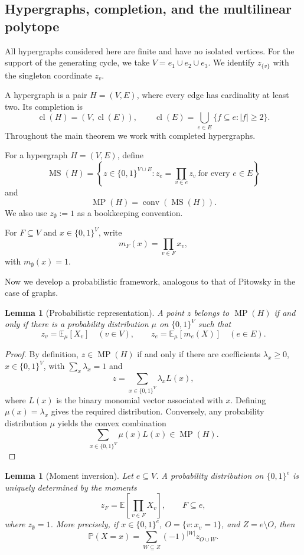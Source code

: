 \documentclass[11pt]{article}
\newtheorem{lemma}[theorem]{Lemma}
\theoremstyle{definition}
\theoremstyle{remark}
\newcommand{\cl}{\operatorname{cl}}
\newcommand{\MP}{\operatorname{MP}}
\newcommand{\E}{\mathbb{E}}
\newcommand{\Prob}{\mathbb{P}}
\newcommand{\MS}{\operatorname{MS}}
\begin{document}
\begin{editedaiblock}

\subsection{Hypergraphs, completion, and the multilinear polytope}

All hypergraphs considered here are finite and have no isolated vertices. For the support of the generating cycle, we take $V=e_1\cup e_2\cup e_3$. We identify $z_{\{v\}}$ with the singleton coordinate $z_v$.

A hypergraph is a pair $H=(V,E)$, where every edge has cardinality at least two. Its completion is
\[
\cl(H)=(V,\cl(E)),\qquad
\cl(E)=\bigcup_{e\in E}\{f\subseteq e:|f|\ge 2\}.
\]
Throughout the main theorem we work with completed hypergraphs.

For a hypergraph $H=(V,E)$, define
\[
\MS(H)=\left\{z\in\{0,1\}^{V\cup E}:z_e=\prod_{v\in e}z_v\ \text{for every }e\in E\right\}
\]
and
\[
\MP(H)=\operatorname{conv}(\MS(H)).
\]
We also use $z_\emptyset:=1$ as a bookkeeping convention.

For $F\subseteq V$ and $x\in\{0,1\}^V$, write
\[
m_F(x)=\prod_{v\in F}x_v,
\]
with $m_\emptyset(x)=1$.

Now we develop a probabilistic framework, analogous to that of Pitowsky \cite{pitowsky1991correlation} in the case of graphs.

\begin{lemma}[Probabilistic representation]\label{lem:prob}
A point $z$ belongs to $\MP(H)$ if and only if there is a probability distribution $\mu$ on $\{0,1\}^V$ such that
\[
z_v=\E_\mu[X_v]\quad(v\in V),\qquad
z_e=\E_\mu[m_e(X)]\quad(e\in E).
\]
\end{lemma}

\begin{proof}
By definition, $z\in\MP(H)$ if and only if there are coefficients $\lambda_x\ge 0$, $x\in\{0,1\}^V$, with $\sum_x\lambda_x=1$ and
\[
z=\sum_{x\in\{0,1\}^V}\lambda_x L(x),
\]
where $L(x)$ is the binary monomial vector associated with $x$. Defining $\mu(x)=\lambda_x$ gives the required distribution. Conversely, any probability distribution $\mu$ yields the convex combination
\[
\sum_{x\in\{0,1\}^V}\mu(x)L(x)\in\MP(H).
\]
\end{proof}

\begin{lemma}[Moment inversion]\label{lem:edge-law}
Let $e\subseteq V$. A probability distribution on $\{0,1\}^e$ is uniquely determined by the moments
\[
z_F=\E\left[\prod_{v\in F}X_v\right],\qquad F\subseteq e,
\]
where $z_\emptyset=1$. More precisely, if $x\in\{0,1\}^e$, $O=\{v:x_v=1\}$, and $Z=e\setminus O$, then
\[
\Prob(X=x)=\sum_{W\subseteq Z}(-1)^{|W|}z_{O\cup W}.
\]
\end{lemma}


\end{editedaiblock}
\end{document}
